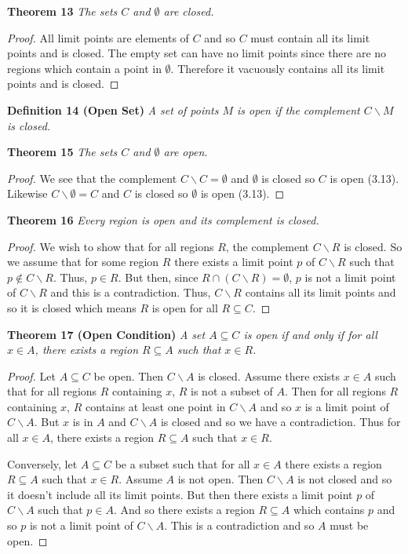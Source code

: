 \documentclass{article}
\begin{document}
\begin{flushleft}
\textbf{Theorem 13}
\textsl{The sets $C$ and $\emptyset$ are closed.}
\begin{proof}
All limit points are elements of $C$ and so $C$ must contain all its limit points and is closed. The empty set can have no limit points since there are no regions which contain a point in $\emptyset$. Therefore it vacuously contains all its limit points and is closed.
\end{proof}

\textbf{Definition 14 (Open Set)}
\textsl{A set of points $M$ is open if the complement $C \backslash M$ is closed.}\newline

\textbf{Theorem 15}
\textsl{The sets $C$ and $\emptyset$ are open.}
\begin{proof}
We see that the complement $C \backslash C = \emptyset$ and $\emptyset$ is closed so $C$ is open (3.13). Likewise $C \backslash \emptyset = C$ and $C$ is closed so $\emptyset$ is open (3.13).
\end{proof}

\textbf{Theorem 16}
\textsl{Every region is open and its complement is closed.}
\begin{proof}
We wish to show that for all regions $R$, the complement $C \backslash R$ is closed. So we assume that for some region $R$ there exists a limit point $p$ of $C \backslash R$ such that $p \notin C \backslash R$. Thus, $p \in R$. But then, since $R \cap (C \backslash R) = \emptyset$, $p$ is not a limit point of $C \backslash R$ and this is a contradiction. Thus, $C \backslash R$ contains all its limit points and so it is closed which means $R$ is open for all $R \subseteq C$.
\end{proof}

\textbf{Theorem 17 (Open Condition)}
\textsl{A set $A \subseteq C$ is open if and only if for all $x \in A$, there exists a region $R \subseteq A$ such that $x \in R$.}
\begin{proof}
Let $A \subseteq C$ be open. Then $C \backslash A$ is closed. Assume there exists $x \in A$ such that for all regions $R$ containing $x$, $R$ is not a subset of $A$. Then for all regions $R$ containing $x$, $R$ contains at least one point in $C \backslash A$ and so $x$ is a limit point of $C \backslash A$. But $x$ is in $A$ and $C \backslash A$ is closed and so we have a contradiction. Thus for all $x \in A$, there exists a region $R \subseteq A$ such that $x \in R$.\newline

Conversely, let $A \subseteq C$ be a subset such that for all $x \in A$ there exists a region $R \subseteq A$ such that $x \in R$. Assume $A$ is not open. Then $C \backslash A$ is not closed and so it doesn't include all its limit points. But then there exists a limit point $p$ of $C \backslash A$ such that $p \in A$. And so there exists a region $R \subseteq A$ which contains $p$ and so $p$ is not a limit point of $C \backslash A$. This is a contradiction and so $A$ must be open.
\end{proof}


\end{flushleft}
\end{document}
